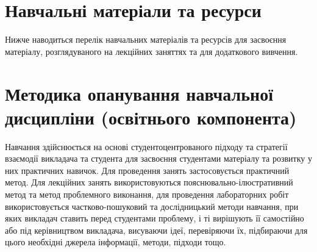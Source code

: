 \documentclass{Syllabus}
\begin{document}
\section{Навчальні матеріали та ресурси}

Нижче наводиться перелік навчальних матеріалів та ресурсів для засвоєння матеріалу, розглядуваного на лекційних заняттях та для додаткового вивчення.

\printbibliography[category=Main, title={Основні}, heading=subbibliography]
\printbibliography[category=Additional, title={Додаткові}, heading=subbibliography]
\printbibliography[category=Applications, title={Програмні продукти}, heading=subbibliography]
\printbibliography[category=OnlineResources, title={Online-ресурси}, heading=subbibliography]
\printbibliography[category=SciArticles, title={Оглядові наукові статті}, heading=subbibliography]

{}

\section{Методика опанування навчальної дисципліни (освітнього компонента)}

Навчання здійснюється на основі студентоцентрованого підходу та стратегії взаємодії викладача та студента для засвоєння студентами матеріалу та розвитку у них практичних навичок. Для проведення занять застосовується практичний метод. Для лекційних занять використовуються пояснювально-ілюстративний метод та метод проблемного виконання, для проведення лабораторних робіт використовується частково-пошуковий та дослідницький методи навчання, при яких викладач ставить перед студентами проблему, і ті вирішують її самостійно або під керівництвом викладача, висуваючи ідеї, перевіряючи їх, підбираючи для цього необхідні джерела інформації, методи, підходи тощо.
\end{document}
